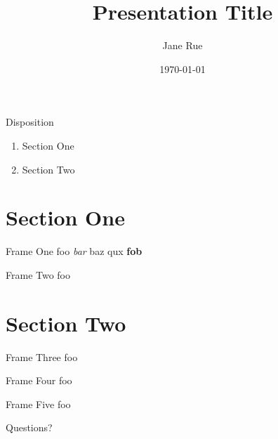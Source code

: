 \documentclass[aspectratio=1610]{beamer}
\title{Presentation Title}
\date{\today}
\author{Jane Rue}
\begin{document}

\maketitle


\begin{frame}{Disposition}
	\begin{enumerate}
		\item Section One
		\item Section Two
	\end{enumerate}
\end{frame}


\section{Section One}


\begin{frame}{Frame One}
	foo \emph{bar} baz \alert{qux} \textbf{fob}
\end{frame}


\begin{frame}{Frame Two}
	foo
\end{frame}


\section{Section Two}


\begin{frame}{Frame Three}
	foo
\end{frame}


\begin{frame}{Frame Four}
	foo
\end{frame}


\begin{frame}{Frame Five}
	foo
\end{frame}


\begin{frame}[standout]
	Questions?
\end{frame}
\end{document}
